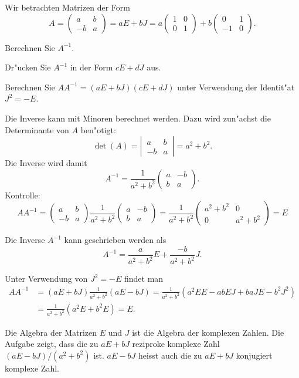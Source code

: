 Wir betrachten Matrizen der Form
\[
A=\begin{pmatrix}a&b\\-b&a\end{pmatrix}
=aE+bJ=a\begin{pmatrix}1&0\\0&1\end{pmatrix}+b\begin{pmatrix}0&1\\-1&0\end{pmatrix}.
\]
\begin{teilaufgaben}
\item
Berechnen Sie $A^{-1}$.
\item
Dr"ucken Sie $A^{-1}$ in der Form $cE+dJ$ aus.
\item
Berechnen Sie $AA^{-1}=(aE+bJ)(cE+dJ)$ unter Verwendung der Identit"at
$J^2=-E$.
\end{teilaufgaben}

\begin{loesung}
\begin{teilaufgaben}
\item
Die Inverse kann mit Minoren berechnet werden.
Dazu wird zun"achst die Determinante von $A$ ben"otigt:
\[
\det(A)=\left|\,\begin{matrix}a&b\\-b&a\end{matrix}\,\right|=a^2+b^2.
\]
Die Inverse wird damit
\[
A^{-1}=\frac1{a^2+b^2}\begin{pmatrix}a&-b\\b&a\end{pmatrix}.
\]
Kontrolle:
\[
AA^{-1}
=
\begin{pmatrix}a&b\\-b&a\end{pmatrix}
\frac{1}{a^2+b^2}
\begin{pmatrix}a&-b\\b&a\end{pmatrix}
=
\frac{1}{a^2+b^2}
\begin{pmatrix}a^2+b^2&0\\0&a^2+b^2 \end{pmatrix}=E
\]
\item
Die Inverse $A^{-1}$ kann geschrieben werden als
\[
A^{-1}
=
\frac{a}{a^2+b^2}E
+
\frac{-b}{a^2+b^2}J.
\]
\item Unter Verwendung von $J^2=-E$ findet man
\begin{align*}
AA^{-1}&=(aE+bJ)\frac1{a^2+b^2}(aE-bJ)
=\frac1{a^2+b^2}(a^2EE-abEJ+baJE-b^2J^2)
\\
&=\frac1{a^2+b^2}(a^2E+b^2E)=E.
\end{align*}
\end{teilaufgaben}
\end{loesung}

\begin{diskussion}
Die Algebra der Matrizen $E$ und $J$ ist die Algebra der komplexen Zahlen.
Die Aufgabe zeigt, dass die zu $aE+bJ$ reziproke komplexe Zahl
$(aE-bJ)/(a^2+b^2)$ ist.
$aE-bJ$ heisst auch die zu $aE+bJ$ konjugiert komplexe Zahl.
\end{diskussion}

